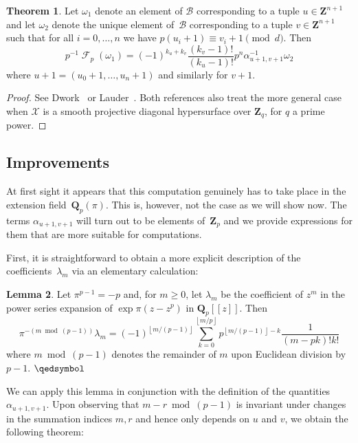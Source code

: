 \documentclass[a4paper,11pt]{article}
\numberwithin{equation}{section}
\providecommand{\floor}[1]{\left\lfloor#1\right\rfloor}   %
\newcommand{\ZZ}{\mathbf{Z}} %
\newcommand{\QQ}{\mathbf{Q}} %
\DeclareMathOperator{\Frob}{\mathcal{F}} %
\providecommand{\cB}{\mathcal{B}} %
\theoremstyle{definition}
\newtheorem{thm}{Theorem}[section]
\newtheorem{lem}[thm]{Lemma}
\begin{document}
\begin{thm} \label{thm:01-03-diagfrob}
Let $\omega_1$ denote an element of $\cB$ corresponding to a tuple 
$u \in \ZZ^{n+1}$ and let $\omega_2$ denote the unique element of~$\cB$ 
corresponding to a tuple $v \in \ZZ^{n+1}$ such that for all 
$i = 0, \dotsc, n$ we have $p (u_i + 1) \equiv v_i + 1 \pmod{d}$. Then
\begin{equation}
p^{-1} \Frob_p (\omega_1) = 
    (-1)^{k_u + k_v} \frac{(k_v - 1)!}{(k_u - 1)!} p^n \alpha_{u+1,v+1}^{-1} \omega_2
\end{equation}
where $u + 1 = (u_0 + 1, \dotsc, u_n + 1)$ and similarly for $v + 1$.
\end{thm}

\begin{proof}
See Dwork~\citep[\S 4]{Dwork1964} or Lauder~\citep[\S 6.1]{Lauder2004b}.  
Both references also treat the more general case when $\mathcal{X}$ is 
a smooth projective diagonal hypersurface over $\ZZ_q$, for $q$ a prime 
power.
\end{proof}

\subsection{Improvements}

At first sight it appears that this computation genuinely has to 
take place in the extension field~$\QQ_p(\pi)$.  This is, however, 
not the case as we will show now.  The terms $\alpha_{u+1,v+1}$ 
will turn out to be elements of~$\ZZ_p$ and we provide expressions 
for them that are more suitable for computations.

First, it is straightforward to obtain a more explicit description 
of the coefficients~$\lambda_m$ via an elementary calculation:

\begin{lem} \label{lem:lambdam}
Let $\pi^{p-1} = -p$ and, for $m \geq 0$, let $\lambda_m$ 
be the coefficient of $z^m$ in the power series expansion 
of $\exp \pi (z - z^p)$ in $\QQ_p[[z]]$.  Then 
\begin{equation}
\pi^{- (m \bmod{(p-1)})} \lambda_m = (-1)^{\floor{m/(p-1)}} \sum_{k=0}^{\floor{m/p}} p^{\floor{m/(p-1)} - k} \frac{1}{(m-pk)! k!}
\end{equation}
where $m \bmod{(p-1)}$ denotes the remainder of $m$ upon Euclidean 
division by $p-1$. \hfill $\qedsymbol$
\end{lem}

We can apply this lemma in conjunction with the definition 
of the quantities $\alpha_{u+1, v+1}$.  Upon observing that 
$m - r \bmod{(p-1)}$ is invariant under changes in the summation 
indices $m, r$ and hence only depends on $u$ and $v$, we obtain 
the following theorem:
\end{document}

